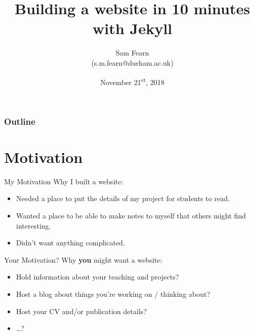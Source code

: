 \documentclass{beamer}
\author{Sam Fearn\\{\small 
(s.m.fearn@durham.ac.uk)}}
\title{Building a website in 10 minutes with Jekyll}
\date{November 21\textsuperscript{st}, 2018}
\begin{document}
\renewcommand{\d}[2][]{\ensuremath{\operatorname{d}^{#1}\!{#2}}}

{

\begin{frame}[plain]
\maketitle
\end{frame}
}

\begin{frame}
       \frametitle{Outline}
       \tableofcontents
\end{frame}
\Large
\section{Motivation} %
\label{sec:motivation}

\begin{frame}{My Motivation}
	Why I built a website:
	
	\begin{itemize}
		\item<2-> Needed a place to put the details of my project for students to read.
		\item<3-> Wanted a place to be able to make notes to myself that others might find interesting.
		\item<4-> Didn't want anything complicated.
	\end{itemize}
\end{frame}

\begin{frame}{Your Motivation?}
	\Large
	Why \textbf{you} might want a website:
	
	\begin{itemize}
		\item<2-> Hold information about your teaching and projects?
		\item<3-> Host a blog about things you're working on / thinking about?
		\item<4-> Host your CV and/or publication details?
		\item<5-> \ldots ?
	\end{itemize}
\end{frame}
\end{document}
